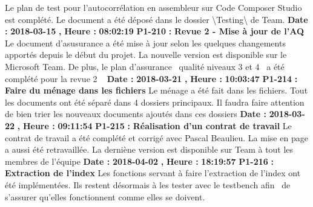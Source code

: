 \documentclass{article}%
\begin{document}
\newline%
\newline%
%
Le plan de test pour l'autocorrélation en assembleur sur Code Composer Studio est complété. Le document a été déposé dans le dossier \textbackslash{}Testing\textbackslash{} de Team.\newline%
\newline%
%
\textbf{Date : }%
\textbf{2018{-}03{-}15}%
\textbf{,}%
\textbf{ Heure : }%
\textbf{08:02:19}%
\newline%
%
\textbf{P1{-}210 }%
\textbf{ : }%
\textbf{ Revue 2 {-} Mise à jour de l'AQ}%
\newline%
\newline%
%
Le document d'asusurance a été mise à jour selon les quelques changements apportés depuis le début du projet. La nouvelle version est disponible sur le Microsoft Team. De plus, le plan d'assurance~ qualité niveaux 3 et 4~ a été complété pour la revue 2\newline%
~\newline%
\newline%
%
\textbf{Date : }%
\textbf{2018{-}03{-}21}%
\textbf{,}%
\textbf{ Heure : }%
\textbf{10:03:47}%
\newline%
%
\textbf{P1{-}214 }%
\textbf{ : }%
\textbf{ Faire du ménage dans les fichiers}%
\newline%
\newline%
%
Le ménage a été fait dans les fichiers. Tout les documents ont été séparé dans 4 dossiers principaux. Il faudra faire attention de bien trier les nouveaux documents ajoutés dans ces dossiers\newline%
\newline%
%
\textbf{Date : }%
\textbf{2018{-}03{-}22}%
\textbf{,}%
\textbf{ Heure : }%
\textbf{09:11:54}%
\newline%
%
\textbf{P1{-}215 }%
\textbf{ : }%
\textbf{ Réalisation d'un contrat de travail}%
\newline%
\newline%
%
Le contrat de travail a été complété et corrigé avec Pascal Beaulieu. La mise en page a aussi été retravaillée. La derniène version est disponible sur Team à tout les membres de l'équipe\newline%
\newline%
%
\textbf{Date : }%
\textbf{2018{-}04{-}02}%
\textbf{,}%
\textbf{ Heure : }%
\textbf{18:19:57}%
\newline%
%
\textbf{P1{-}216 }%
\textbf{ : }%
\textbf{ Extraction de l'index}%
\newline%
\newline%
%
Les fonctions servant à faire l'extraction de l'index ont été implémentées. Ils restent désormais à les tester avec le testbench afin~ de s'assurer qu'elles fonctionnent comme elles se doivent.\newline%
\newline%
%
\newpage
\end{document}
